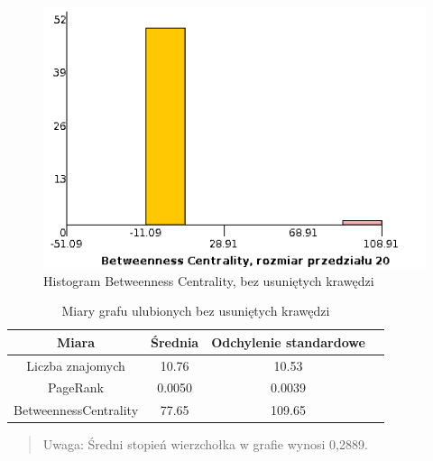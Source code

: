 \documentclass[10pt,a4paper]{article}
\begin{document}
\begin{figure}[H]
\centering
\caption{Histogram Betweenness Centrality, bez usuniętych krawędzi}
\includegraphics[scale=0.6]{wyniki/final200Loved/0200lovedBCHist.png}
\end{figure}


\begin{table}[H]
  \caption{Miary grafu ulubionych  bez usuniętych krawędzi}
  \centering
    \begin{tabular}{cccc}
    \addlinespace
    \toprule
    Miara & Średnia  & Odchylenie standardowe \\
    \midrule
    Liczba znajomych & 10.76 & 10.53 \\
    PageRank & 0.0050 & 0.0039 \\
    BetweennessCentrality & 77.65 & 109.65\\ 
    \bottomrule
    \end{tabular}
  \label{tab:addlabel}
\end{table}
\begin{verse}
 \centering
    Uwaga: Średni stopień wierzchołka w grafie wynosi 0,2889.
\end{verse}

  
\end{document}
